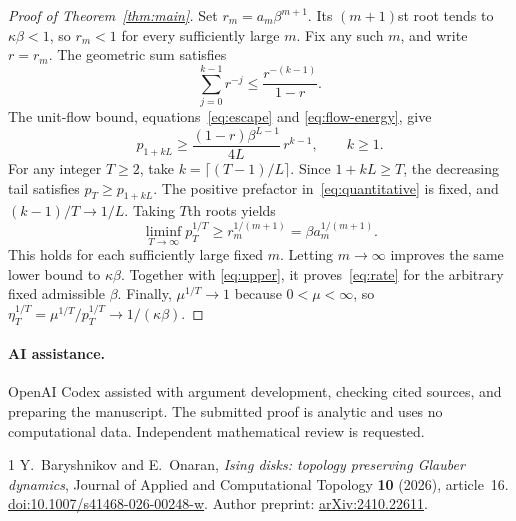 \documentclass[11pt]{article}
\begin{document}
\begin{proof}[Proof of Theorem~\ref{thm:main}]
Set $r_m=a_m\beta^{m+1}$. Its $(m+1)$st root tends to
$\kappa\beta<1$, so $r_m<1$ for every sufficiently large $m$.
Fix any such $m$, and write $r=r_m$. The geometric sum satisfies
\[
 \sum_{j=0}^{k-1}r^{-j}\le\frac{r^{-(k-1)}}{1-r}.
\]
The unit-flow bound, equations~\eqref{eq:escape} and
\eqref{eq:flow-energy}, give
\begin{equation}\label{eq:quantitative}
 p_{1+kL}\ge
 \frac{(1-r)\beta^{L-1}}{4L}\,r^{k-1},\qquad k\ge1.
\end{equation}
For any integer $T\ge2$, take $k=\lceil(T-1)/L\rceil$. Since
$1+kL\ge T$, the decreasing tail satisfies $p_T\ge p_{1+kL}$.
The positive prefactor in~\eqref{eq:quantitative} is fixed, and
$(k-1)/T\to1/L$. Taking $T$th roots yields
\[
 \liminf_{T\to\infty}p_T^{1/T}
 \ge r_m^{1/(m+1)}=\beta a_m^{1/(m+1)}.
\]
This holds for each sufficiently large fixed $m$. Letting $m\to\infty$
improves the same lower bound to $\kappa\beta$. Together with
\eqref{eq:upper}, it proves~\eqref{eq:rate} for the arbitrary fixed
admissible $\beta$. Finally, $\mu^{1/T}\to1$ because $0<\mu<\infty$,
so $\eta_T^{1/T}=\mu^{1/T}/p_T^{1/T}\to1/(\kappa\beta)$.
\end{proof}

\paragraph{AI assistance.}
OpenAI Codex assisted with argument development, checking cited sources,
and preparing the manuscript. The submitted proof is analytic and uses no
computational data. Independent mathematical review is requested.

\begin{thebibliography}{1}
Y.~Baryshnikov and E.~Onaran,
\emph{Ising disks: topology preserving Glauber dynamics},
Journal of Applied and Computational Topology \textbf{10} (2026), article~16.
\href{https://doi.org/10.1007/s41468-026-00248-w}{doi:10.1007/s41468-026-00248-w}.
Author preprint: \href{https://arxiv.org/abs/2410.22611}{arXiv:2410.22611}.
\end{thebibliography}
\end{document}
